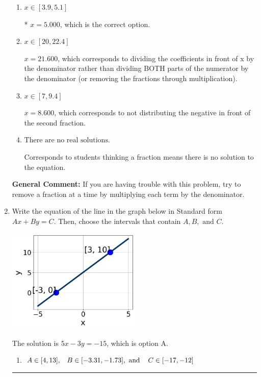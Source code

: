 \documentclass{extbook}[14pt]
\newcommand{\litem}[1]{\item #1

\rule{\textwidth}{0.4pt}}
\begin{document}
\begin{enumerate}
{\begin{enumerate}[label=\Alph*.]
 $x = 1.042$, which corresponds to dividing the second number in the numerator by the denominator rather than dividing BOTH parts of the numerator by the denominator (or removing the fractions through multiplication).
\item \( x \in [3.9, 5.1] \)

* $x = 5.000$, which is the correct option.
\item \( x \in [20, 22.4] \)

 $x = 21.600$, which corresponds to dividing the coefficients in front of x by the denominator rather than dividing BOTH parts of the numerator by the denominator (or removing the fractions through multiplication).
\item \( x \in [7, 9.4] \)

 $x = 8.600$, which corresponds to not distributing the negative in front of the second fraction.
\item \( \text{There are no real solutions.} \)

Corresponds to students thinking a fraction means there is no solution to the equation.
\end{enumerate}

\textbf{General Comment:} If you are having trouble with this problem, try to remove a fraction at a time by multiplying each term by the denominator.
}
\litem{
Write the equation of the line in the graph below in Standard form $Ax+By=C$. Then, choose the intervals that contain $A, B, \text{ and } C$.

\begin{center}
    \includegraphics[width=0.5\textwidth]{../Figures/linearGraphToStandardCopyA.png}
\end{center}




The solution is \( 5x - 3y = -15 \), which is option A.\begin{enumerate}[label=\Alph*.]
\item \( A \in [4, 13], \hspace{3mm} B \in [-3.31, -1.73], \text{ and } \hspace{3mm} C \in [-17, -12] \)


\end{enumerate}}
\end{enumerate}
\end{document}
